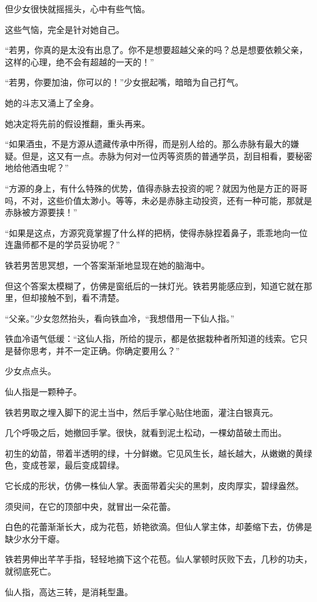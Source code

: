 \begin{this_body}
但少女很快就摇摇头，心中有些气恼。

这些气恼，完全是针对她自己。

“若男，你真的是太没有出息了。你不是想要超越父亲的吗？总是想要依赖父亲，这样的心理，绝不会有超越的一天的！”

“若男，你要加油，你可以的！”少女抿起嘴，暗暗为自己打气。

她的斗志又涌上了全身。

她决定将先前的假设推翻，重头再来。

“如果酒虫，不是方源从遗藏传承中所得，而是别人给的。那么赤脉有最大的嫌疑。但是，这又有一点。赤脉为何对一位丙等资质的普通学员，刮目相看，要秘密地给他酒虫呢？”

“方源的身上，有什么特殊的优势，值得赤脉去投资的呢？就因为他是方正的哥哥吗，不对，这些价值太渺小。等等，未必是赤脉主动投资，还有一种可能，那就是赤脉被方源要挟！”

“如果是这点，方源究竟掌握了什么样的把柄，使得赤脉捏着鼻子，乖乖地向一位连蛊师都不是的学员妥协呢？”

铁若男苦思冥想，一个答案渐渐地显现在她的脑海中。

但这个答案太模糊了，仿佛是窗纸后的一抹灯光。铁若男能感应到，知道它就在那里，但却接触不到，看不清楚。

“父亲。”少女忽然抬头，看向铁血冷，“我想借用一下仙人指。”

铁血冷语气低缓：“这仙人指，所给的提示，都是依据栽种者所知道的线索。它只是替你思考，并不一定正确。你确定要用么？”

少女点点头。

仙人指是一颗种子。

铁若男取之埋入脚下的泥土当中，然后手掌心贴住地面，灌注白银真元。

几个呼吸之后，她撤回手掌。很快，就看到泥土松动，一棵幼苗破土而出。

初生的幼苗，带着半透明的绿，十分鲜嫩。它见风生长，越长越大，从嫩嫩的黄绿色，变成苍翠，最后变成碧绿。

它长成的形状，仿佛一株仙人掌。表面带着尖尖的黑刺，皮肉厚实，碧绿盎然。

须臾间，在它的顶部中央，就冒出一朵花蕾。

白色的花蕾渐渐长大，成为花苞，娇艳欲滴。但仙人掌主体，却萎缩下去，仿佛是缺少水分干瘪。

铁若男伸出芊芊手指，轻轻地摘下这个花苞。仙人掌顿时灰败下去，几秒的功夫，就彻底死亡。

仙人指，高达三转，是消耗型蛊。


\end{this_body}

